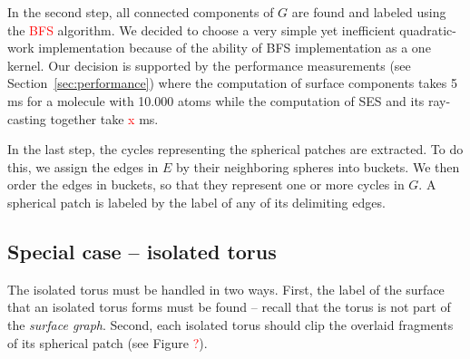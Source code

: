 In the second step, all connected components of $G$ are found and labeled using the \textcolor{red}{BFS} algorithm.
We decided to choose a very simple yet inefficient \cite{merrill2012scalable} quadratic-work implementation because of the ability of BFS implementation as a one kernel.
Our decision is supported by the performance measurements (see Section~\ref{sec:performance}) where the computation of surface components takes {\tweakedsim}5 ms for a molecule with {\tweakedsim}10.000 atoms while the computation of SES and its ray-casting together take {\tweakedsim}\textcolor{red}{x} ms.

In the last step, the cycles representing the spherical patches are extracted.
To do this, we assign the edges in $E$ by their neighboring spheres into buckets.
We then order the edges in buckets, so that they represent one or more cycles in $G$.
A spherical patch is labeled by the label of any of its delimiting edges.

\subsection{Special case -- isolated torus}

The isolated torus must be handled in two ways.
First, the label of the surface that an isolated torus forms must be found -- recall that the torus is not part of the \textit{surface graph}.
Second, each isolated torus should clip the overlaid fragments of its spherical patch (see Figure \textcolor{red}{?}).


